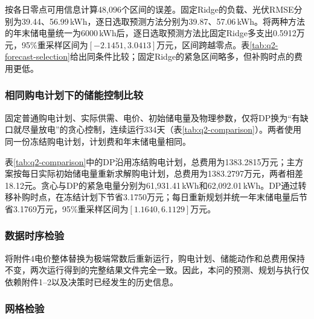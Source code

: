 按各日零点可用信息计算48,096个区间的误差。固定Ridge的负载、光伏RMSE分别为39.44、56.99\,kWh，逐日选取预测方法分别为39.87、57.06\,kWh。将两种方法的年末储电量统一为6000\,kWh后，逐日选取预测方法比固定Ridge多支出0.5912万元，95\%重采样区间为$[-2.1451,3.0413]$万元，区间跨越零点。表\ref{tab:q2-forecast-selection}给出同条件比较；固定Ridge的紧急区间略多，但补购时点的费用更低。

\begin{table}[H]
    \centering\small
    \caption{统一6000 kWh年末储电量下固定Ridge与逐日选取预测方法的比较}
    \label{tab:q2-forecast-selection}
    \renewcommand{\arraystretch}{1.15}
    
\end{table}

\subsubsection{相同购电计划下的储能控制比较}

固定普通购电计划、实际供需、电价、初始储电量及物理参数，仅将DP换为“有缺口就尽量放电”的贪心控制，连续运行334天（表\ref{tab:q2-comparison}）。两者使用同一份冻结购电计划，计划费和年末储电量相同。

\begin{table}[H]
    \centering\small
    \caption{冻结同一普通购电计划后的储能控制方法费用比较}
    \label{tab:q2-comparison}
    \renewcommand{\arraystretch}{1.15}
    
\end{table}

表\ref{tab:q2-comparison}中的DP沿用冻结购电计划，总费用为1383.2815万元；主方案按每日实际初始储电量重新求解购电计划，总费用为1383.2797万元，两者相差18.12元。贪心与DP的紧急电量分别为61,931.41\,kWh和62,092.01\,kWh。DP通过转移补购时点，在冻结计划下节省3.1750万元；每日重新规划并统一年末储电量后节省3.1769万元，95\%重采样区间为$[1.1640,6.1129]$万元。

\subsubsection{数据时序检验}

将附件4电价整体替换为极端常数后重新运行，购电计划、储能动作和总费用保持不变，两次运行得到的完整结果文件完全一致。因此，本问的预测、规划与执行仅依赖附件1--2以及决策时已经发生的历史信息。



\subsubsection{网格检验}


